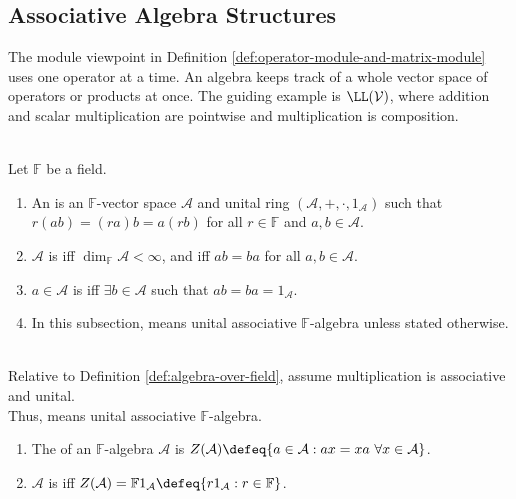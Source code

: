 \subsection{Associative Algebra Structures}


The module viewpoint in Definition \ref{def:operator-module-and-matrix-module} uses one operator at a time. An algebra keeps track of a whole vector space of operators or products at once. The guiding example is $\LL(\mathcal{V})$, where addition and scalar multiplication are pointwise and multiplication is composition.

\begin{definition} \label{def:unital-associative-algebra} \\
Let $\mathbb{F}$ be a field.
\begin{enumerate}[label=(\roman*)]
\setlength{\itemsep}{0pt}
\item An  is an $\mathbb{F}$-vector space $\mathcal{A}$ and unital ring $(\mathcal{A},+,\cdot,1_{\mathcal{A}})$ such that $r(ab)=(ra)b=a(rb)$ for all $r\in\mathbb{F}$ and $a,b\in\mathcal{A}$.
\item $\mathcal{A}$ is  iff $\dim_{\mathbb{F}}\mathcal{A}<\infty$, and  iff $ab=ba$ for all $a,b\in\mathcal{A}$.
\item $a\in\mathcal{A}$ is  iff $\exists b\in\mathcal{A}$ such that $ab=ba=1_{\mathcal{A}}$.
\item In this subsection,  means unital associative $\mathbb{F}$-algebra unless stated otherwise.
\end{enumerate}
\end{definition}

\begin{remark} \label{rem:algebra-convention-relative-to-ring-definition} \\
Relative to Definition \ref{def:algebra-over-field}, assume multiplication is associative and unital.\\
Thus,  means unital associative $\mathbb{F}$-algebra.
\end{remark}

\begin{definition} \label{def:center-and-central-algebra} 
\begin{enumerate}[label=(\roman*)]
\setlength{\itemsep}{0pt}
\item The  of an $\mathbb{F}$-algebra $\mathcal{A}$ is $Z(\mathcal{A})\defeq\{a\in\mathcal{A}: ax=xa\ \forall x\in\mathcal{A}\}$.
\item $\mathcal{A}$ is  iff $Z(\mathcal{A})=\mathbb{F}1_{\mathcal{A}}\defeq\{r1_{\mathcal{A}}:r\in\mathbb{F}\}$.
\end{enumerate}
\end{definition}

